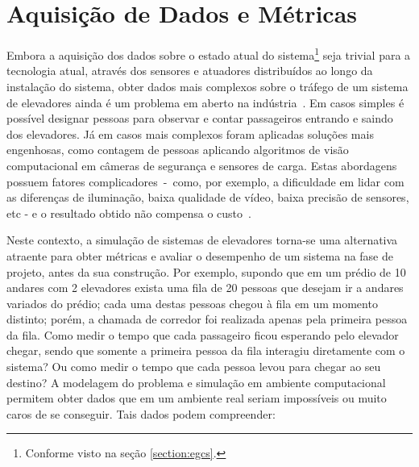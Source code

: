 \section{\label{section:data}Aquisição de Dados e Métricas}

Embora a aquisição dos dados sobre o estado atual do sistema\footnote{Conforme
visto na seção \ref{section:egcs}.} seja trivial para a tecnologia atual,
através dos sensores e atuadores distribuídos ao longo da instalação do sistema,
obter dados mais complexos sobre o tráfego de um sistema de elevadores ainda é
um problema em aberto na indústria~\cite{KOEHLEROTTIGER02}. Em casos simples é
possível designar pessoas para observar e contar passageiros entrando e saindo
dos elevadores. Já em casos mais complexos foram aplicadas soluções mais
engenhosas, como contagem de pessoas aplicando algoritmos de visão computacional
em câmeras de segurança e sensores de carga. Estas abordagens possuem fatores
complicadores~-~como, por exemplo, a dificuldade em lidar com as diferenças de
iluminação, baixa qualidade de vídeo, baixa precisão de sensores, etc - e o
resultado obtido não compensa o custo~\cite{KOEHLEROTTIGER02}.

Neste contexto, a simulação de sistemas de elevadores torna-se uma alternativa
atraente para obter métricas e avaliar o desempenho de um sistema na fase de
projeto, antes da sua construção. Por exemplo, supondo que em um prédio de 10
andares com 2 elevadores exista uma fila de 20 pessoas que desejam ir a andares
variados do prédio; cada uma destas pessoas chegou à fila em um momento
distinto; porém, a chamada de corredor foi realizada apenas pela primeira pessoa
da fila. Como medir o tempo que cada passageiro ficou esperando pelo elevador
chegar, sendo que somente a primeira pessoa da fila interagiu diretamente com o
sistema? Ou como medir o tempo que cada pessoa levou para chegar ao seu destino?
A modelagem do problema e simulação em ambiente computacional permitem obter
dados que em um ambiente real seriam impossíveis ou muito caros de se conseguir.
Tais dados podem compreender:

